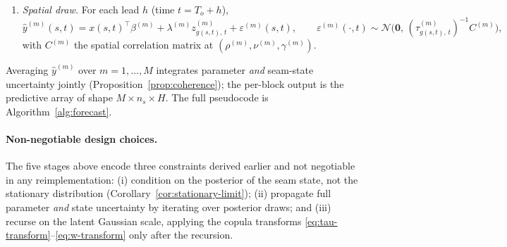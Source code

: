 \documentclass[11pt]{article}
\theoremstyle{definition}
\theoremstyle{remark}
\newcommand{\Norm}{\mathcal{N}}
\begin{document}
\begin{enumerate}[label=\textbf{(\arabic*)},leftmargin=2.4em,
                  itemsep=3pt,topsep=2pt]
        i.e.\ the half-normal scale $\sigma_z$ uses the same draw's
        forecasted $\tau$, not an independent marginal.
  \item \emph{Spatial draw.} For each lead $h$ (time
        $t = T_o + h$),
        \begin{equation*}
          \hat y^{(m)}(s,t)
          = x(s,t)^\top\beta^{(m)}
          + \lambda^{(m)} z^{(m)}_{g(s,t),\,t}
          + \varepsilon^{(m)}(s,t),
          \qquad
          \varepsilon^{(m)}(\cdot,t) \sim
            \Norm\!\Big(\bm 0,\,(\tau^{(m)}_{g(s,t),\,t})^{-1} C^{(m)}\Big),
        \end{equation*}
        with $C^{(m)}$ the spatial correlation matrix at
        $(\rho^{(m)},\nu^{(m)},\gamma^{(m)})$.
\end{enumerate}
Averaging $\hat y^{(m)}$ over $m=1,\dots,M$ integrates parameter
\emph{and} seam-state uncertainty jointly
(Proposition~\ref{prop:coherence}); the per-block output is the
predictive array of shape $M \times n_s \times H$. The full
pseudocode is Algorithm~\ref{alg:forecast}.

\paragraph{Non-negotiable design choices.}
The five stages above encode three constraints derived earlier and
not negotiable in any reimplementation:
(i) condition on the posterior of the seam state, not the stationary
distribution (Corollary~\ref{cor:stationary-limit});
(ii) propagate full parameter \emph{and} state uncertainty by iterating
over posterior draws; and
(iii) recurse on the latent Gaussian scale, applying the copula
transforms \eqref{eq:tau-transform}--\eqref{eq:w-transform} only after
the recursion.
\end{document}

